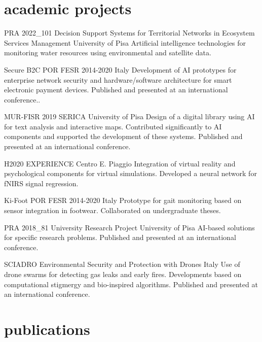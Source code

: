 \documentclass[]{style}
\begin{document}
\section{academic projects}
\begin{entrylist}
  
\entry
{PRA 2022\_101}
{Decision Support Systems for Territorial Networks in Ecosystem Services Management}
{University of Pisa}
{Artificial intelligence technologies for monitoring water resources using environmental and satellite data.}

\entry
{Secure B2C}
{POR FESR 2014-2020}
{Italy}
{Development of AI prototypes for enterprise network security and hardware/software architecture for smart electronic payment devices. Published and presented at an international conference..}

\entry
{MUR-FISR 2019}
{SERICA}
{University of Pisa}
{Design of a digital library using AI for text analysis and interactive maps. Contributed significantly to AI components and supported the development of these systems. Published and presented at an international conference.}

\entry
{H2020}
{EXPERIENCE}
{Centro E. Piaggio}
{Integration of virtual reality and psychological components for virtual simulations. Developed a neural network for fNIRS signal regression.}

\entry
{Ki-Foot}
{POR FESR 2014-2020}
{Italy}
{Prototype for gait monitoring based on sensor integration in footwear. Collaborated on undergraduate theses.}

\entry
{PRA 2018\_81}
{University Research Project}
{University of Pisa}
{AI-based solutions for specific research problems. Published and presented at an international conference.}

\entry
{SCIADRO}
{Environmental Security and Protection with Drones}
{Italy}
{Use of drone swarms for detecting gas leaks and early fires. Developments based on computational stigmergy and bio-inspired algorithms. Published and presented at an international conference.}
  
\end{entrylist}

\section{publications}

\end{document}
